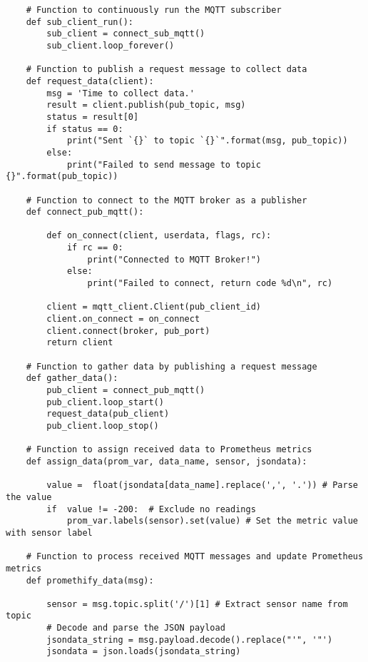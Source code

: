 \begin{verbatim}
    # Function to continuously run the MQTT subscriber
    def sub_client_run():
        sub_client = connect_sub_mqtt()
        sub_client.loop_forever()

    # Function to publish a request message to collect data
    def request_data(client):
        msg = 'Time to collect data.'
        result = client.publish(pub_topic, msg)
        status = result[0]
        if status == 0:
            print("Sent `{}` to topic `{}`".format(msg, pub_topic))
        else:
            print("Failed to send message to topic {}".format(pub_topic))

    # Function to connect to the MQTT broker as a publisher
    def connect_pub_mqtt():

        def on_connect(client, userdata, flags, rc):
            if rc == 0:
                print("Connected to MQTT Broker!")
            else:
                print("Failed to connect, return code %d\n", rc)

        client = mqtt_client.Client(pub_client_id)
        client.on_connect = on_connect
        client.connect(broker, pub_port)
        return client

    # Function to gather data by publishing a request message
    def gather_data():
        pub_client = connect_pub_mqtt()
        pub_client.loop_start()
        request_data(pub_client)
        pub_client.loop_stop()

    # Function to assign received data to Prometheus metrics
    def assign_data(prom_var, data_name, sensor, jsondata):

        value =  float(jsondata[data_name].replace(',', '.')) # Parse the value
        if  value != -200:  # Exclude no readings
            prom_var.labels(sensor).set(value) # Set the metric value with sensor label  

    # Function to process received MQTT messages and update Prometheus metrics
    def promethify_data(msg):

        sensor = msg.topic.split('/')[1] # Extract sensor name from topic
        # Decode and parse the JSON payload
        jsondata_string = msg.payload.decode().replace("'", '"') 
        jsondata = json.loads(jsondata_string)


\end{verbatim}
